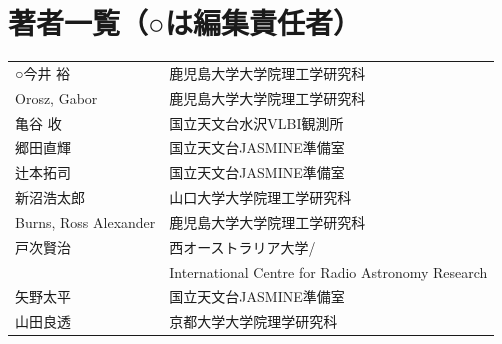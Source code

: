 \newpage
\section*{著者一覧（○は編集責任者）}
\begin{tabular}{ll}
\noalign{\smallskip}
○今井 裕 & 鹿児島大学大学院理工学研究科 \\
Orosz, Gabor & 鹿児島大学大学院理工学研究科 \\
亀谷 收 & 国立天文台水沢VLBI観測所 \\
郷田直輝 & 国立天文台JASMINE準備室 \\
辻本拓司 & 国立天文台JASMINE準備室 \\
新沼浩太郎 & 山口大学大学院理工学研究科 \\
Burns, Ross Alexander & 鹿児島大学大学院理工学研究科 \\
戸次賢治 & 西オーストラリア大学/ \\
& International Centre for Radio Astronomy Research \\
矢野太平 & 国立天文台JASMINE準備室 \\
山田良透 & 京都大学大学院理学研究科 \\
\end{tabular}


